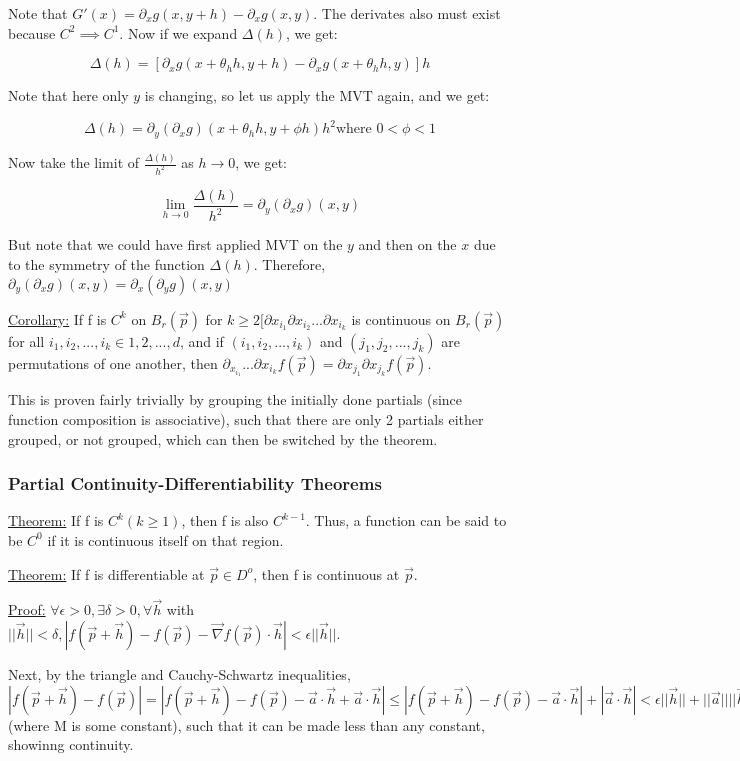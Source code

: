 \documentclass[11 pt, twoside]{article}
\begin{document}
Note that $G'(x) = \partial_x g(x, y+h) - \partial_x g(x, y)$. The derivates
also must exist because $C^2 \implies C^1$. Now if we expand $\Delta(h)$, we
get:

$$\Delta(h) = [\partial_x g(x + \theta_h h, y + h) - \partial_x g(x + \theta_hh,
y)] h$$

Note that here only $y$ is changing, so let us apply the MVT again, and we get:

$$\Delta(h) = \partial_y (\partial_x g) (x + \theta_h h, y + \phi h)h^2 \text{
where } 0 < \phi < 1$$

Now take the limit of $\frac{\Delta(h)}{h^2}$ as $h \to 0$, we get:

$$\lim_{h\to0} \frac{\Delta(h)}{h^2} = \partial_y (\partial_x g)(x, y)$$

But note that we could have first applied MVT on the $y$ and then on the $x$ due
to the symmetry of the function $\Delta(h)$. Therefore, $\partial_y (\partial_x
g)(x, y) = \partial_x (\partial_y g)(x, y)$

\underline{Corollary:}
If f is $C^k$ on $B_r(\vec{p})$ for $k \geq 2 [\partial{x_{i_1}}\partial{x_{i_2}}...\partial{x_{i_k}}$ is continuous on $B_r(\vec{p})$ for all $i_1, i_2, ..., i_k \in {1, 2, ..., d}$, and if $(i_1, i_2, ..., i_k)$ and $(j_1, j_2, ..., j_k)$ are permutations of one another, then $\partial_{x_{i_1}}...\partial{x_{i_k}}f(\vec{p}) = \partial{x_{j_1}}\partial{x_{j_k}}f(\vec{p})$.

This is proven fairly trivially by grouping the initially done partials (since function composition is associative), such that there are only 2 partials either grouped, or not grouped, which can then be switched by the theorem.

\subsubsection{Partial Continuity-Differentiability Theorems}
\underline{Theorem:}
If f is $C^k (k \geq 1)$, then f is also $C^{k-1}$. Thus, a function can be said to be $C^0$ if it is continuous itself on that region. 

\underline{Theorem:}
If f is differentiable at $\vec{p} \in D^o$, then f is continuous at $\vec{p}$.

\underline{Proof:}
$\forall \epsilon > 0, \exists \delta > 0, \forall \vec{h}$ with $||\vec{h}|| < \delta, |f(\vec{p} + \vec{h}) - f(\vec{p}) - \vec{\nabla}f(\vec{p}) \cdot \vec{h}| < \epsilon||\vec{h}||$.

Next, by the triangle and Cauchy-Schwartz inequalities, $|f(\vec{p} + \vec{h}) - f(\vec{p})| = |f(\vec{p} + \vec{h}) - f(\vec{p}) - \vec{a} \cdot \vec{h} + \vec{a} \cdot \vec{h}| \leq |f(\vec{p} + \vec{h}) - f(\vec{p}) - \vec{a} \cdot \vec{h}| + |\vec{a} \cdot \vec{h}| < \epsilon||\vec{h}|| + ||\vec{a}||||\vec{h}|| = (1 + ||\vec{a}||)||\vec{h}|| = M||\vec{h}||$ (where M is some constant), such that it can be made less than any constant, showinng continuity.
\end{document}
